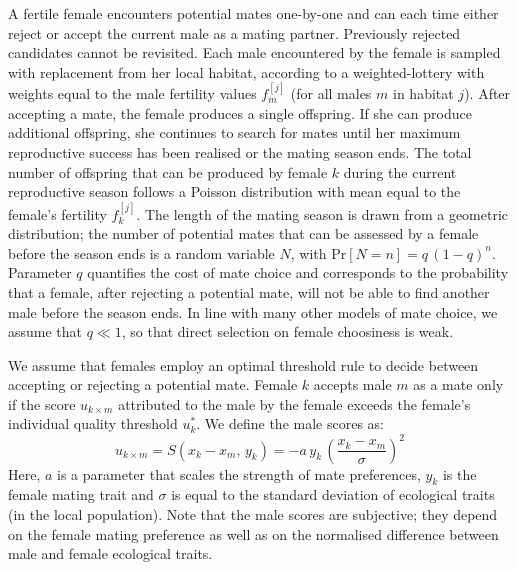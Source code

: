 \documentclass[11pt]{article}
\newcommand{\scr}[3]{\ensuremath{{#1}_{#2}^{[#3]}}}
\begin{document}
A fertile female encounters potential mates one-by-one and can each time either reject or accept the current male as a mating partner. Previously rejected candidates cannot be revisited. Each male encountered by the female is sampled with replacement from her local habitat, according to a weighted-lottery with weights equal to the male fertility values $\scr{f}{m}{j}$ (for all males $m$ in habitat $j$). After accepting a mate, the female produces a single offspring. If she can produce additional offspring, she continues to search for mates until her maximum reproductive success has been realised or the mating season ends. The total number of offspring that can be produced by female $k$ during the current reproductive season follows a Poisson distribution with mean equal to the female's fertility $\scr{f}{k}{j}$. The length of the mating season is drawn from a geometric distribution; the number of potential mates that can be assessed by a female before the season ends is a random variable $N$, with $\mathrm{Pr}[N = n] = q\,(1-q)^n$. Parameter $q$ quantifies the cost of mate choice and corresponds to the probability that a female, after rejecting a potential mate, will not be able to find another male before the season ends. In line with many other models of mate choice, we assume that $q \ll 1$, so that direct selection on female choosiness is weak.  

We assume that females employ an optimal threshold rule to decide between accepting or rejecting a potential mate. Female $k$ accepts male $m$ as a mate only if the score $u_{k \times m}$ attributed to the male by the female exceeds the female's individual quality threshold $u^*_k$. We define the male scores as:
\begin{equation}
\label{eq:score_function}
u_{k \times m} = S(x_k - x_m,\, y_k) = -a\,y_k\,\left(\frac{x_k - x_m}{\sigma}\right)^2
\end{equation}    
Here, $a$ is a parameter that scales the strength of mate preferences, $y_k$ is the female mating trait and $\sigma$ is equal to the standard deviation of ecological traits (in the local population). Note that the male scores are subjective; they depend on the female mating preference as well as on the normalised difference between male and female ecological traits.
\end{document}
